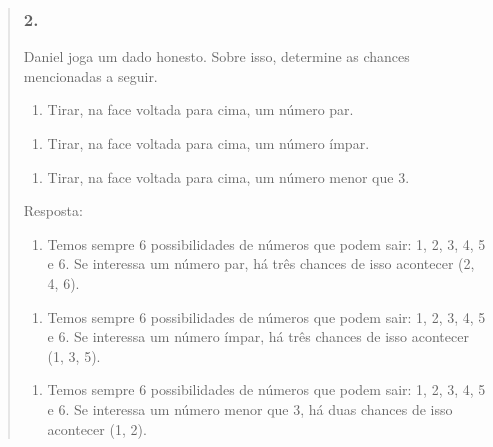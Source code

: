 \begin{enumerate}
\begin{escolha}
\begin{enumerate}
\begin{itemize}
\begin{itemize}
\begin{escolha}
\begin{quote}
\begin{escolha}
\subsubsection{2.}\label{section-79}

Daniel joga um dado honesto. Sobre isso, determine as chances mencionadas a seguir.

\begin{enumerate}
\def\labelenumi{\alph{enumi})}
\item
  Tirar, na face voltada para cima, um número par.
\end{enumerate}


\begin{enumerate}
\def\labelenumi{\alph{enumi})}
\item
  Tirar, na face voltada para cima, um número ímpar.
\end{enumerate}


\begin{enumerate}
\def\labelenumi{\alph{enumi})}
\item
  Tirar, na face voltada para cima, um número menor que 3.
\end{enumerate}


Resposta:

\begin{enumerate}
\def\labelenumi{\alph{enumi})}
\item
  Temos sempre 6 possibilidades de números que podem sair: 1, 2, 3, 4, 5 e 6. Se interessa um número par, há três chances de isso acontecer (2, 4, 6).
\end{enumerate}

\begin{enumerate}
\def\labelenumi{\alph{enumi})}
\item
  Temos sempre 6 possibilidades de números que podem sair: 1, 2, 3, 4, 5 e 6. Se interessa um número ímpar, há três chances de isso acontecer (1, 3, 5).
\end{enumerate}

\begin{enumerate}
\def\labelenumi{\alph{enumi})}
\item
  Temos sempre 6 possibilidades de números que podem sair: 1, 2, 3, 4, 5 e 6. Se interessa um número menor que 3, há duas chances de isso acontecer (1, 2).
\end{enumerate}



\end{escolha}
\end{quote}
\end{escolha}
\end{itemize}
\end{itemize}
\end{enumerate}
\end{escolha}
\end{enumerate}
